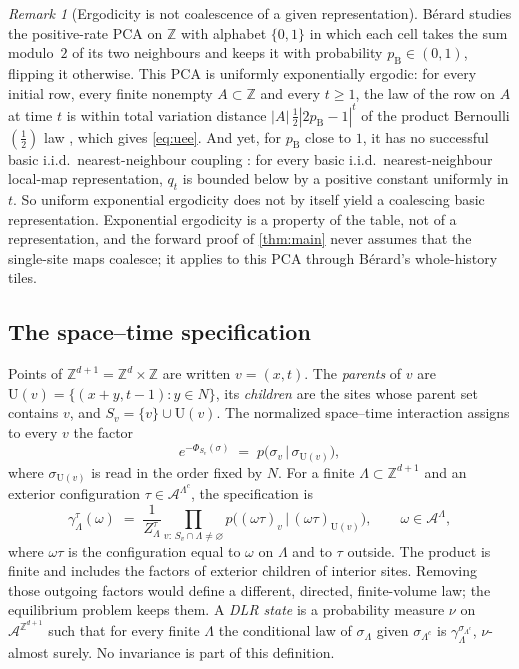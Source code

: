 \documentclass[11pt]{article}
\theoremstyle{plain}
\theoremstyle{definition}
\theoremstyle{remark}
\newtheorem{remark}[theorem]{Remark}
\newcommand{\A}{\mathcal{A}}
\newcommand{\Z}{\mathbb{Z}}
\newcommand{\Lam}{\Lambda}
\newcommand{\Ue}{\mathrm{U}}
\begin{document}
\begin{remark}[Ergodicity is not coalescence of a given representation]
\label{rem:berard22}
B\'erard \cite{Berard22} studies the positive-rate PCA on $\Z$ with alphabet $\{0,1\}$ in which each cell takes the sum modulo~$2$ of its two neighbours and keeps it with probability $p_{\mathrm B}\in(0,1)$, flipping it otherwise. This PCA is uniformly exponentially ergodic: for every initial row, every finite nonempty $A\subset\Z$ and every $t\ge1$, the law of the row on $A$ at time $t$ is within total variation distance $|A|\,\frac12|2p_{\mathrm B}-1|^t$ of the product Bernoulli$(\frac12)$ law \cite[Section~4.1, Proposition~1]{Berard22}, which gives \eqref{eq:uee}. And yet, for $p_{\mathrm B}$ close to $1$, it has no successful basic i.i.d.\ nearest-neighbour coupling \cite[Theorem~1]{Berard22}: for every basic i.i.d.\ nearest-neighbour local-map representation, $q_t$ is bounded below by a positive constant uniformly in $t$. So uniform exponential ergodicity does not by itself yield a coalescing basic representation. Exponential ergodicity is a property of the table, not of a representation, and the forward proof of \cref{thm:main} never assumes that the single-site maps coalesce; it applies to this PCA through B\'erard's whole-history tiles.
\end{remark}

\subsection{The space--time specification}

Points of $\Z^{d+1}=\Z^d\times\Z$ are written $v=(x,t)$. The \emph{parents} of $v$ are $\Ue(v)=\{(x+y,t-1):y\in N\}$, its \emph{children} are the sites whose parent set contains $v$, and $S_v=\{v\}\cup\Ue(v)$. The normalized space--time interaction assigns to every $v$ the factor
\begin{equation}
e^{-\Phi_{S_v}(\sigma)}\;=\;p\bigl(\sigma_v\,\big|\,\sigma_{\Ue(v)}\bigr),
\label{eq:factor}
\end{equation}
where $\sigma_{\Ue(v)}$ is read in the order fixed by $N$. For a finite $\Lam\subset\Z^{d+1}$ and an exterior configuration $\tau\in\A^{\Lam^c}$, the specification is
\begin{equation}
\gamma^\tau_\Lam(\omega)\;=\;\frac1{Z^\tau_\Lam}\prod_{v:\,S_v\cap\Lam\neq\varnothing}p\bigl((\omega\tau)_v\,\big|\,(\omega\tau)_{\Ue(v)}\bigr),\qquad\omega\in\A^\Lam,
\label{eq:spec}
\end{equation}
where $\omega\tau$ is the configuration equal to $\omega$ on $\Lam$ and to $\tau$ outside. The product is finite and includes the factors of exterior children of interior sites. Removing those outgoing factors would define a different, directed, finite-volume law; the equilibrium problem keeps them. A \emph{DLR state} is a probability measure $\nu$ on $\A^{\Z^{d+1}}$ such that for every finite $\Lam$ the conditional law of $\sigma_\Lam$ given $\sigma_{\Lam^c}$ is $\gamma^{\sigma_{\Lam^c}}_\Lam$, $\nu$-almost surely. No invariance is part of this definition.
\end{document}
